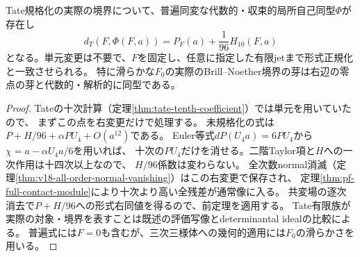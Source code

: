 \begin{theorem}[実際の境界の厳密な十次正規形]
\label{thm:pf-exact-algebraic-tenth}
Tate規格化の実際の境界について、普遍同変な代数的・収束的局所自己同型$\Phi$が存在し
\[
 d_T(F,\Phi(F,a))=P_F(a)+\frac1{96}H_{10}(F,a)
\]
となる。単元変更は不要で、$F$を固定し、任意に指定した有限jetまで形式正規化と一致させられる。
特に滑らかな$F_0$の実際のBrill--Noether境界の芽は右辺の零点の芽と代数的・解析的に同型である。
\end{theorem}
\begin{proof}
Tateの十次計算（定理\ref{thm:tate-tenth-coefficient}）では単元を用いていたので、
まずこの点を右変更だけで処理する。
未規格化の式は$P+H/96+\alpha PU_4+O(a^{12})$である。
Euler等式$dP(U_4a)=6PU_4$から$\chi=a-\alpha U_4a/6$を用いれば、
十次の$PU_4$だけを消せる。二階Taylor項と$H$への一次作用は十四次以上なので、
$H/96$係数は変わらない。
全次数normal消滅（定理\ref{thm:v18-all-order-normal-vanishing}）はこの右変更で保存され、
定理\ref{thm:pf-full-contact-module}により十次より高い全残差が通常像に入る。
共変場の逐次消去で$P+H/96$への形式右同値を得るので、前定理を適用する。
Tate有限族が実際の対象・境界を表すことは既述の評価写像とdeterminantal idealの比較による。
普遍式には$F=0$も含むが、三次三様体への幾何的適用には$F_0$の滑らかさを用いる。
\end{proof}

